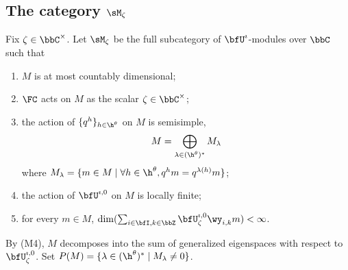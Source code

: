 \documentclass[reqno]{amsart}
\numberwithin{equation}{section}
\begin{document}
\subsection{The category $\sM_\zeta$}\label{ss:category-M}
Fix $\zeta\in\bbC^\times$. Let $\sM_\zeta$ be the full subcategory of $\bfU^\imath$-modules over $\bbC$ such that
\begin{enumerate}[label=(M\arabic*)]\itemsep0.25cm
	\item\label{cond:M1} $M$ is at most countably dimensional;
	\item\label{cond:M2} $\FC$ acts on $M$ as the scalar $\zeta\in\bbC^\times$;
	\item\label{cond:M3} the action of $\{q^h\}_{h\in\h^{\theta}}$ on $M$ is semisimple, \ie
	\[M=\bigoplus_{\lambda\in(\h^{\theta})^*}M_\lambda\]
	where $M_\lambda=\{m\in M\mid \forall h\in\h^{\theta}, q^hm=q^{\lambda(h)}m\}$;
	\item\label{cond:M4} the action of $\bfU^{\imath,0}$ on $M$ is locally finite;
	\item\label{cond:M5} for every $m\in M$, $\dim(\sum_{i\in\bfI,k\in\bbZ}{\bfU^{\imath,0}_\zeta}\wy_{i,k}m)<\infty$.
\end{enumerate}
By (M4), $M$ decomposes into the sum of generalized eigenspaces with respect to $\bfU^{\imath,0}_\zeta$. Set $P(M)=\{\lambda\in(\h^\theta)^*\mid M_\lambda\neq0\}$.
\end{document}

